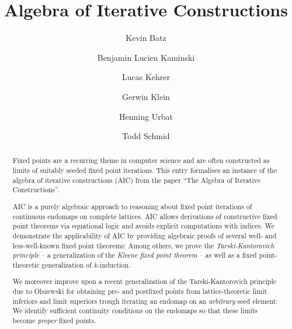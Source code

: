 \documentclass[11pt,a4paper]{article}
\begin{document}
\title{Algebra of Iterative Constructions}
\author{Kevin Batz \and Benjamin Lucien Kaminski \and Lucas Kehrer \and Gerwin Klein \and Henning Urbat \and Todd Schmid}
\maketitle

\begin{abstract}
Fixed points are a recurring theme in computer science and are often constructed
as limits of suitably seeded fixed point iterations. This entry formalises an
instance of the algebra of iterative constructions (AIC) from the paper ``The
Algebra of Iterative Constructions''.

AIC is a purely algebraic approach to reasoning about fixed point iterations of
continuous endomaps on complete lattices. AIC allows derivations of constructive
fixed point theorems via equational logic and avoids explicit computations with
indices. We demonstrate the applicability of AIC by providing algebraic proofs
of several well- and less-well-known fixed point theorems: Among others, we
prove the \emph{Tarski-Kantorovich principle} -- a generalization of the
\emph{Kleene fixed point theorem} -- as well as a fixed point-theoretic
generalization of $k$-induction.

We moreover improve upon a recent generalization of the Tarski-Kantorovich
principle due to Olszewski for obtaining pre- and postfixed points from
lattice-theoretic limit inferiors and limit superiors trough iterating an
endomap on an \emph{arbitrary} seed element: We identify sufficient continuity
conditions on the endomaps so that these limits become \emph{proper} fixed
points.
\end{abstract}


\end{document}
